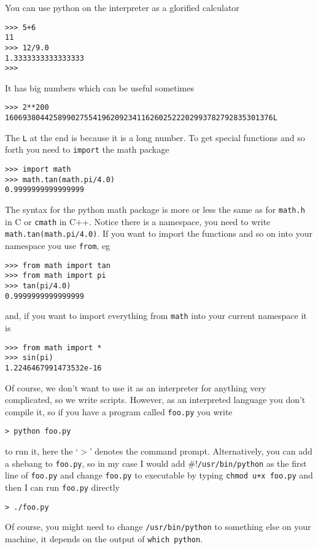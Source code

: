 \documentclass[11pt,a4paper]{scrartcl}
\begin{document}
You can use python on the interpreter as a glorified calculator
\begin{lstlisting}[numbers=right]
>>> 5+6
11
>>> 12/9.0
1.3333333333333333
>>> 
\end{lstlisting}
It has big numbers which can be useful sometimes
\begin{lstlisting}[numbers=right]
>>> 2**200
1606938044258990275541962092341162602522202993782792835301376L
\end{lstlisting}
The \texttt{L} at the end is because it is a long number. To get
special functions and so forth you need to \texttt{import} the math
package 
\begin{lstlisting}[numbers=right]
>>> import math
>>> math.tan(math.pi/4.0)
0.9999999999999999
\end{lstlisting}

The syntax for the python math package is more or less the same as for
\texttt{math.h} in C or \texttt{cmath} in C++. Notice there is a namespace,
you need to write \texttt{math.tan(math.pi/4.0)}. If you want to
import the functions and so on into your namespace you use
\texttt{from}, eg
\begin{lstlisting}[numbers=right]
>>> from math import tan 
>>> from math import pi
>>> tan(pi/4.0)
0.9999999999999999
\end{lstlisting}
and, if you want to import everything from \texttt{math} into your current namespace it is 
\begin{lstlisting}[numbers=right]
>>> from math import *
>>> sin(pi)
1.2246467991473532e-16
\end{lstlisting}

Of course, we don't want to use it as an interpreter for anything very
complicated, so we write scripts. However, as an interpreted language
you don't compile it, so if you have a program called \texttt{foo.py}
you write
\begin{lstlisting}[numbers=right]
> python foo.py
\end{lstlisting}
to run it, here the \lq{}$>$\rq{} denotes the command
prompt. Alternatively, you can add a shebang to \texttt{foo.py}, so in
my case I would add \texttt{$\#!$/usr/bin/python} as the first line of
\texttt{foo.py} and change \texttt{foo.py} to executable by typing
\texttt{chmod u+x foo.py} and then I can run \texttt{foo.py} directly
\begin{lstlisting}[numbers=right]
> ./foo.py
\end{lstlisting}
Of course, you might need to change \texttt{/usr/bin/python} to
something else on your machine, it depends on the output of
\texttt{which python}.
\end{document}

